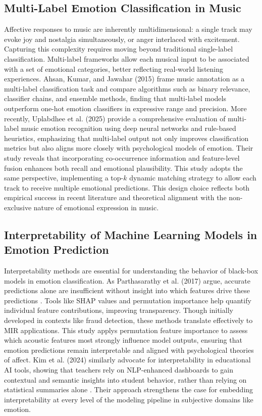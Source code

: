 \documentclass{article}
\begin{document}
\subsection{Multi-Label Emotion Classification in Music}

Affective responses to music are inherently multidimensional: a single track may evoke joy and nostalgia simultaneously, or anger interlaced with excitement. Capturing this complexity requires moving beyond traditional single-label classification. Multi-label frameworks allow each musical input to be associated with a set of emotional categories, better reflecting real-world listening experiences. Ahsan, Kumar, and Jawahar (2015) frame music annotation as a multi-label classification task and compare algorithms such as binary relevance, classifier chains, and ensemble methods, finding that multi-label models outperform one-hot emotion classifiers in expressive range and precision. More recently, Uplabdhee et al. (2025) provide a comprehensive evaluation of multi-label music emotion recognition using deep neural networks and rule-based heuristics, emphasizing that multi-label output not only improves classification metrics but also aligns more closely with psychological models of emotion. Their study reveals that incorporating co-occurrence information and feature-level fusion enhances both recall and emotional plausibility. This study adopts the same perspective, implementing a top-$k$ dynamic matching strategy to allow each track to receive multiple emotional predictions. This design choice reflects both empirical success in recent literature and theoretical alignment with the non-exclusive nature of emotional expression in music.



\subsection{Interpretability of Machine Learning Models in Emotion Prediction}

Interpretability methods are essential for understanding the behavior of black-box models in emotion classification. As Parthasarathy et al. (2017) argue, accurate predictions alone are insufficient without insight into which features drive these predictions \parencite{Parthasarathy2017}. Tools like SHAP values and permutation importance help quantify individual feature contributions, improving transparency. Though initially developed in contexts like fraud detection, these methods translate effectively to MIR applications. This study applys permutation feature importance to assess which acoustic features most strongly influence model outputs, ensuring that emotion predictions remain interpretable and aligned with psychological theories of affect. Kim et al. (2024) similarly advocate for interpretability in educational AI tools, showing that teachers rely on NLP-enhanced dashboards to gain contextual and semantic insights into student behavior, rather than relying on statistical summaries alone \parencite{Kim2024}. Their approach strengthens the case for embedding interpretability at every level of the modeling pipeline in subjective domains like emotion.
\end{document}
